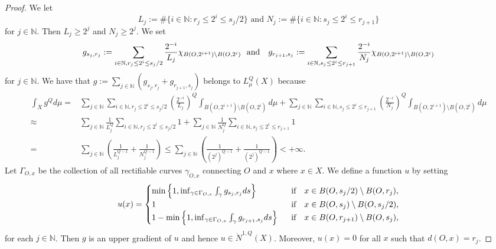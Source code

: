 \documentclass[10pt]{amsart}
\numberwithin{equation}{section}
\begin{document}
\begin{proof}
 We let 
\[\text{
$L_j:=\#\{i\in\mathbb N: r_j\leq 2^i\leq s_j/2\}$ \ and \  $N_j:=\#\{i\in\mathbb N: s_j\leq 2^i\leq r_{j+1}\}$
}
\]
for $j\in\mathbb N$.
 Then $L_j\geq 2^j$ and $N_j\geq 2^j$. We set 
 \[
 g_{s_{j}, r_j}:=  \sum_{i\in\mathbb N, r_j\leq 2^i\leq s_j/2} \frac{2^{-i}}{L_j} \chi_{B(O,2^{i+1})\setminus B(O,2^{i})} \text{\rm \ \ and \ \ } g_{r_{j+1}, s_j}:= \sum_{i\in\mathbb N, s_j\leq 2^i\leq r_{j+1}} \frac{2^{-i}}{N_j}  \chi_{B(O,2^{i+1})\setminus B(O,2^{i})}
 \]
for $j\in\mathbb N$.
 We have that $g:=\sum_{j\in\mathbb N} (g_{s_{j}, r_j}+  g_{r_{j+1}, s_j})$ belongs to $L_\mu^Q(X)$ because 
 \begin{align*}
 \int_Xg^Qd\mu=& \sum_{j\in\mathbb N}  \sum_{i\in\mathbb N, r_j\leq 2^i\leq s_j/2} \left(\frac{2^{-i}}{L_j}\right)^Q \int_{ B(O,2^{i+1})\setminus B(O,2^{i})}d\mu +  \sum_{j\in\mathbb N}  \sum_{i\in\mathbb N, s_j\leq 2^i\leq r_{j+1}} \left(\frac{2^{-i}}{N_j}\right)^Q \int_{ B(O,2^{i+1})\setminus B(O,2^{i})}d\mu \\
 \approx & \sum_{j\in\mathbb N} \frac{1}{L_j^Q}  \sum_{i\in\mathbb N, r_j\leq 2^i\leq s_j/2}  1 + \sum_{j\in\mathbb N}\frac{1}{N_j^Q}  \sum_{i\in\mathbb N, s_j\leq 2^i\leq r_{j+1}}  1\\
 =& \sum_{j\in\mathbb N} \left(\frac{1}{L_j^{Q-1}}+\frac{1}{N_j^{Q-1}}\right)\leq \sum_{j\in\mathbb N} \left(\frac{1}{(2^{j})^{Q-1}} +\frac{1}{(2^j)^{Q-1}}\right)<+\infty. 
 \end{align*}
 Let $\Gamma_{O,x}$ be the collection of all rectifiable curves $\gamma_{O,x}$ connecting $O$ and $x$ where $x\in X$. We define a function $u$ by setting
 \[	
 u(x)=
 \begin{cases}
 	\min\left\{1, \inf_{\gamma\in\Gamma_{O,x}} \int_{\gamma} g_{s_j,r_j}ds \right\}	 & \text{\rm \ \ if \ \ $x\in B(O,s_j/2)\setminus B(O,r_j)$},\\ 
	1& \text{\rm \ \ if \ \ $x\in B(O,s_j)\setminus B(O,s_j/2)$},\\
	1- \min\left\{1, \inf_{\gamma\in\Gamma_{O,x}} \int_{\gamma} g_{r_{j+1},s_j}ds \right\}	& \text{\rm \ \ if \ \ $x\in B(O,r_{j+1})\setminus B(O,s_j)$},
\end{cases}
 \]
for each $j\in\mathbb N$.
 Then $g$ is an upper gradient of $u$ and hence $u\in\dot N^{1,Q}(X)$.  Moreover, $u(x)=0$ for all $x$ such that $d(O,x)=r_j$.  


\end{proof}
\end{document}
